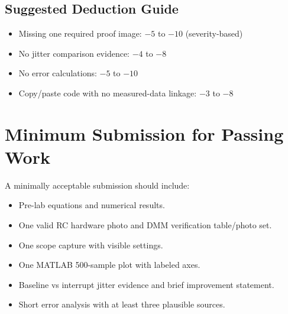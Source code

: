 \documentclass[11pt,letterpaper]{article}
\begin{document}
\subsection*{Suggested Deduction Guide}
\begin{itemize}[leftmargin=1.2em]
    \item Missing one required proof image: \(-5\) to \(-10\) (severity-based)
    \item No jitter comparison evidence: \(-4\) to \(-8\)
    \item No error calculations: \(-5\) to \(-10\)
    \item Copy/paste code with no measured-data linkage: \(-3\) to \(-8\)
\end{itemize}

\section{Minimum Submission for Passing Work}
A minimally acceptable submission should include:
\begin{itemize}[leftmargin=1.2em]
    \item Pre-lab equations and numerical results.
    \item One valid RC hardware photo and DMM verification table/photo set.
    \item One scope capture with visible settings.
    \item One MATLAB 500-sample plot with labeled axes.
    \item Baseline vs interrupt jitter evidence and brief improvement statement.
    \item Short error analysis with at least three plausible sources.
\end{itemize}
\end{document}

